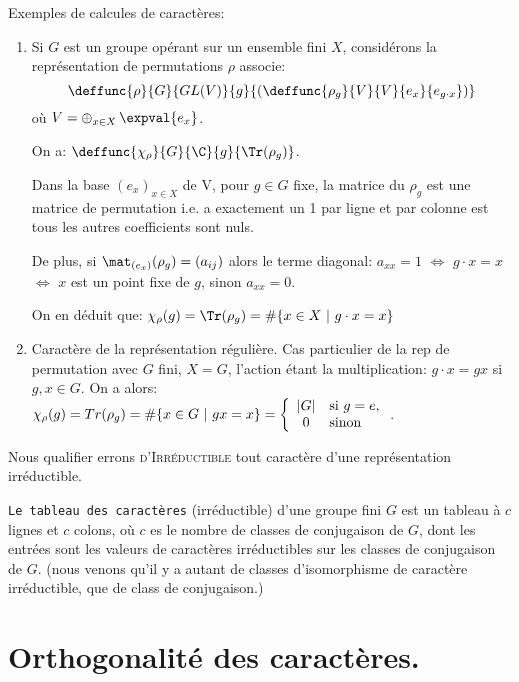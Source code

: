 \begin{examplebox}
	Exemples de calcules de caractères:
\begin{enumerate}
	\item Si $G$ est un groupe opérant sur un ensemble fini $X$, considérons la représentation de permutations $\rho$ associe:
	$$\deffunc{\rho}{G}{GL(V)}{g}{\left( \deffunc{\rho_g}{V}{V}{e_x}{e_{g\cdot x}} \right)}$$
	où $V=\mathop{\oplus}_{\substack{x\in X}}\expval{e_x}$.
	
	On a: $\deffunc{\chi_\rho}{G}{\C}{g}{\Tr(\rho_g)}$.

	Dans la base $(e_x)_{x\in X}$ de V, pour $g\in G$ fixe, la matrice du $\rho_g$ est une matrice de permutation i.e. a exactement un 1 par ligne et par colonne est tous les autres coefficients sont nuls.
	
	De plus, si $\mat_{(e_x)}(\rho_g)=(a_{ij})$ alors le terme diagonal: $a_{xx}=1$  $\Leftrightarrow$   $g\cdot x=x$  $\Leftrightarrow$  $x$ est un point fixe de $g$, sinon $a_{xx}=0$.
	
	On en déduit que: $\chi_\rho(g)=\Tr(\rho_g)=\#\{x\in X\ |\ g\cdot x= x\}$
	\item Caractère de la représentation régulière.
	Cas particulier de la rep de permutation avec $G$ fini, $X=G$, l'action étant la multiplication: $g\cdot x=gx$ si $g,x\in G$.
	On a alors: $\chi_\rho(g)=Tr(\rho_g)=\#\{x\in G\ |\ gx=x\}=\left\{\begin{array}{cl}|G|&\mbox{si }g=e\mbox,\\0& \mbox{sinon }\end{array}\right.$.
\end{enumerate}
\end{examplebox}


\begin{definition}
	Nous qualifier errons \textsc{d’Irréductible} tout caractère d’une représentation irréductible.
\end{definition}
	
	\texttt{Le tableau des caractères} (irréductible) d'une groupe fini $G$ est un tableau  à $c$ lignes et $c$ colons, où $c$ es le nombre de classes de conjugaison de $G$, dont les entrées sont les valeurs de caractères irréductibles sur les classes de conjugaison de $G$. (nous venons qu'il y a autant de classes d'isomorphisme de caractère irréductible, que de class de conjugaison.) 
	
\section{Orthogonalité des caractères.} %

